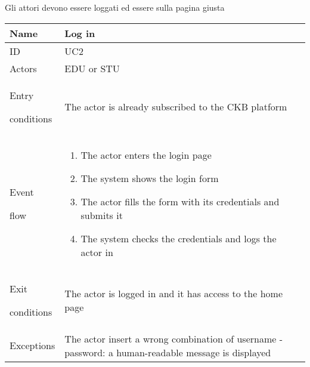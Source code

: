 {\color{red} Gli attori devono essere loggati ed essere sulla pagina giusta}

\begin{center}
    \def\arraystretch{1.5}
    \begin{tabular}{| m{2cm} | m{10cm}|}
        \hline
        Name                  & Log in                                                                                             \\ \hline
        ID                    & UC2                                                                                                \\ \hline
        Actors                & EDU or STU                                                                                         \\ \hline
        Entry \par conditions & The actor is already subscribed to the CKB platform                                                \\ \hline
        Event \par flow       & \begin{enumerate}
                                    \item The actor enters the login page
                                    \item The system shows the login form
                                    \item The actor fills the form with its credentials and submits it
                                    \item The system checks the credentials and logs the actor in
                                \end{enumerate}                                  \\ \hline
        Exit \par conditions  & The actor is logged in and it has access to the home page                                          \\ \hline
        Exceptions            & The actor insert a wrong combination of username - password: a human-readable message is displayed \\ \hline
    \end{tabular}
\end{center}

